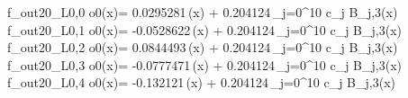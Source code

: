 f_{out20_L0,0	o0}(x)= 0.0295281\,\phi(x) + 0.204124\,\sum_{j=0}^{10} c_j B_{j,3}(x)
f_{out20_L0,1	o0}(x)= -0.0528622\,\phi(x) + 0.204124\,\sum_{j=0}^{10} c_j B_{j,3}(x)
f_{out20_L0,2	o0}(x)= 0.0844493\,\phi(x) + 0.204124\,\sum_{j=0}^{10} c_j B_{j,3}(x)
f_{out20_L0,3	o0}(x)= -0.0777471\,\phi(x) + 0.204124\,\sum_{j=0}^{10} c_j B_{j,3}(x)
f_{out20_L0,4	o0}(x)= -0.132121\,\phi(x) + 0.204124\,\sum_{j=0}^{10} c_j B_{j,3}(x)
